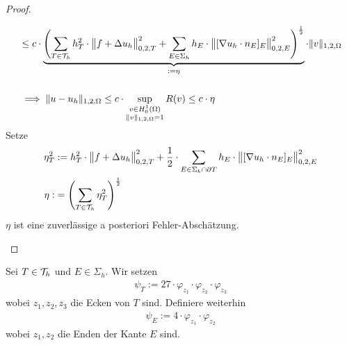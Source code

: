 \begin{proof}
\begin{enumerate}[label=\roman*)]
\begin{align*}
			&\leq
			c\cdot\underbrace{\left(\sum\limits_{T\in\T_h} h^2_T\cdot\big\Vert f+\Delta u_h\big\Vert^2_{0,2,T}
			+\sum\limits_{E\in\Sigma_h}h_E\cdot\big\Vert[\nabla u_h\cdot n_E]_E\big\Vert^2_{0,2,E}\right)^{\frac{1}{2}}}_{:=\eta}\cdot\Vert v\Vert_{1,2,\Omega}\nl
			&\implies
			\Vert u-u_h\Vert_{1,2,\Omega}
			\leq
			c\cdot\sup\limits_{\begin{subarray}{c}v\in H_0^1(\Omega)\\\Vert v\Vert_{1,2,\Omega}=1\end{subarray}}R(v) \leq c \cdot \eta
		\end{align*}
		Setze
		\begin{align*}
			\eta_T^2&:=h_T^2\cdot\big\Vert f+\Delta u_h\big\Vert^2_{0,2,T}+\frac{1}{2}\cdot\sum\limits_{E\in\Sigma_k\cap\partial T}h_E\cdot\big\Vert[\nabla u_h\cdot n_E]_E\big\Vert^2_{0,2,E}\\
			\eta:&=\left(\sum\limits_{T\in\mathcal{T}_h}\eta^2_T\right)^{\frac{1}{	2}}
		\end{align*}
		$\eta$ ist eine zuverlässige a posteriori Fehler-Abschätzung. \qedhere
	\end{enumerate}
\end{proof}

\begin{definition}\enter %
	Sei $T\in\mathcal{T}_h$ und $E\in\Sigma_h$. Wir setzen
	\begin{align*}
		\psi_T:=27\cdot\varphi_{z_1}\cdot\varphi_{z_2}\cdot\varphi_{z_3}
	\end{align*}
	wobei $z_1,z_2,z_3$ die Ecken von $T$ sind. Definiere weiterhin
	\begin{align*}
		\psi_E:=4\cdot\varphi_{z_1}\cdot\varphi_{z_2}
	\end{align*}
	wobei $z_1,z_2$ die Enden der Kante $E$ sind.
\end{definition}


